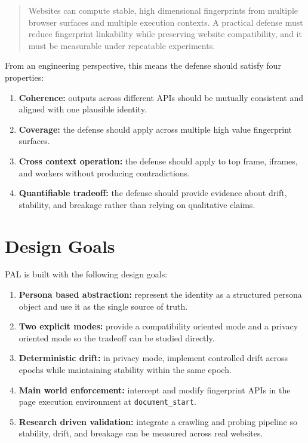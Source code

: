 \documentclass[11pt]{report}
\begin{document}
\begin{quote}
Websites can compute stable, high dimensional fingerprints from multiple browser surfaces and multiple execution contexts. A practical defense must reduce fingerprint linkability while preserving website compatibility, and it must be measurable under repeatable experiments.
\end{quote}

From an engineering perspective, this means the defense should satisfy four properties:

\begin{enumerate}
    \item \textbf{Coherence:} outputs across different APIs should be mutually consistent and aligned with one plausible identity.
    \item \textbf{Coverage:} the defense should apply across multiple high value fingerprint surfaces.
    \item \textbf{Cross context operation:} the defense should apply to top frame, iframes, and workers without producing contradictions.
    \item \textbf{Quantifiable tradeoff:} the defense should provide evidence about drift, stability, and breakage rather than relying on qualitative claims.
\end{enumerate}

\section{Design Goals}

PAL is built with the following design goals:

\begin{enumerate}
    \item \textbf{Persona based abstraction:} represent the identity as a structured persona object and use it as the single source of truth.
    \item \textbf{Two explicit modes:} provide a compatibility oriented mode and a privacy oriented mode so the tradeoff can be studied directly.
    \item \textbf{Deterministic drift:} in privacy mode, implement controlled drift across epochs while maintaining stability within the same epoch.
    \item \textbf{Main world enforcement:} intercept and modify fingerprint APIs in the page execution environment at \texttt{document\_start}.
    \item \textbf{Research driven validation:} integrate a crawling and probing pipeline so stability, drift, and breakage can be measured across real websites.
\end{enumerate}
\end{document}
